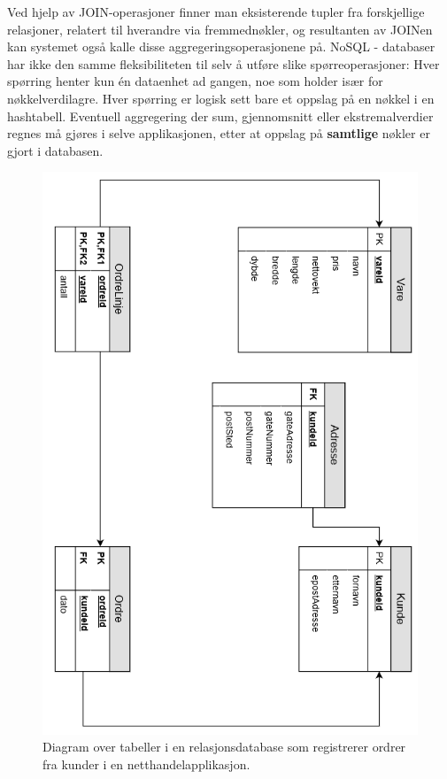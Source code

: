 Ved hjelp av JOIN-operasjoner finner man eksisterende tupler fra forskjellige relasjoner, relatert til hverandre via fremmednøkler, og resultanten av JOINen kan systemet også kalle disse aggregeringsoperasjonene på. NoSQL - databaser har ikke den samme fleksibiliteten til selv å utføre slike spørreoperasjoner: Hver spørring henter kun én dataenhet ad gangen, noe som holder især for nøkkelverdilagre. Hver spørring er logisk sett bare et oppslag på en nøkkel i en hashtabell. Eventuell aggregering der sum, gjennomsnitt eller ekstremalverdier regnes må gjøres i selve applikasjonen, etter at oppslag på \textbf{samtlige} nøkler er gjort i databasen.

\begin{figure}[ht]
    \centering
    \includegraphics[scale=0.7]{fig/NettbutikkOrdreModell.png}
    \caption{Diagram over tabeller i en relasjonsdatabase som registrerer ordrer fra kunder i en netthandelapplikasjon.}
    \label{fig1}
\end{figure}
 
